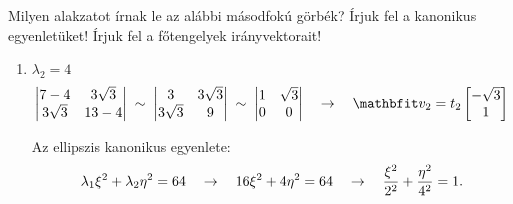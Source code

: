 \begin{exercise}{%
    Milyen alakzatot írnak le az alábbi másodfokú görbék?
    Írjuk fel a kanonikus egyenletüket!
    Írjuk fel a főtengelyek irányvektorait!
  }
{\begin{enumerate}[a)]
\begin{enumerate}[1)]
\[\begin{vmatrix}
                      \end{vmatrix}
                      \quad \rightarrow \quad
                      \rvec v_1 = t_1 \begin{bmatrix}
                        1 \\ \sqrt{3}
                      \end{bmatrix}
                    \]
              \item $\lambda_2 = 4$
                    \[
                      \begin{vmatrix}
                        7 - 4      & 3 \sqrt{3} \\
                        3 \sqrt{3} & 13 - 4
                      \end{vmatrix} \;\sim\; \begin{vmatrix}
                        3          & 3 \sqrt{3} \\
                        3 \sqrt{3} & 9
                      \end{vmatrix} \;\sim\; \begin{vmatrix}
                        1 & \sqrt{3} \\
                        0 & 0
                      \end{vmatrix}
                      \quad \rightarrow \quad
                      \rvec v_2 = t_2 \begin{bmatrix}
                        -\sqrt{3} \\ 1
                      \end{bmatrix}
                    \]

                    Az ellipszis kanonikus egyenlete:
                    \[
                      \lambda_1 \xi^2 + \lambda_2 \eta^2 = 64
                      \quad \rightarrow \quad
                      16 \xi^2 + 4 \eta^2 = 64
                      \quad \rightarrow \quad
                      \frac{\xi^2}{2^2} + \frac{\eta^2}{4^2} = 1
                      \text.
                    \]

                    \begin{center}
\end{center}
\end{enumerate}
\end{enumerate}}
\end{exercise}
